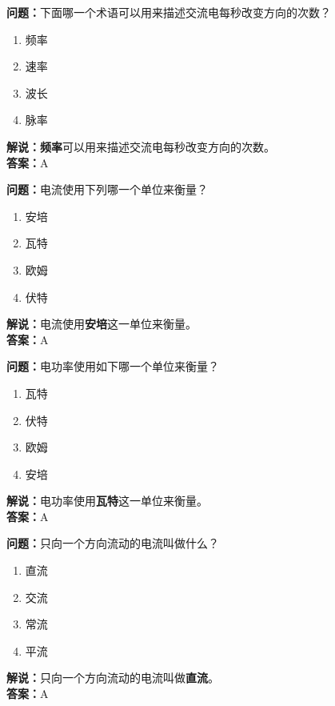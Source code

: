 \textbf{问题：}下面哪一个术语可以用来描述交流电每秒改变方向的次数？

\begin{enumerate}[label=\Alph*), leftmargin=1cm]
	\item 频率
	\item 速率
	\item 波长
	\item 脉率
\end{enumerate}

\textbf{解说：}\textbf{频率}可以用来描述交流电每秒改变方向的次数。\\\textbf{答案：}A



\textbf{问题：}电流使用下列哪一个单位来衡量？

\begin{enumerate}[label=\Alph*), leftmargin=1cm]
	\item 安培
	\item 瓦特
	\item 欧姆
	\item 伏特
\end{enumerate}

\textbf{解说：}电流使用\textbf{安培}这一单位来衡量。\\\textbf{答案：}A%



\textbf{问题：}电功率使用如下哪一个单位来衡量？

\begin{enumerate}[label=\Alph*), leftmargin=1cm]
	\item 瓦特
	\item 伏特
	\item 欧姆
	\item 安培
\end{enumerate}

\textbf{解说：}电功率使用\textbf{瓦特}这一单位来衡量。\\\textbf{答案：}A



\textbf{问题：}只向一个方向流动的电流叫做什么？

\begin{enumerate}[label=\Alph*), leftmargin=1cm]
	\item 直流
	\item 交流
	\item 常流
	\item 平流
\end{enumerate}

\textbf{解说：}只向一个方向流动的电流叫做\textbf{直流}。\\\textbf{答案：}A



